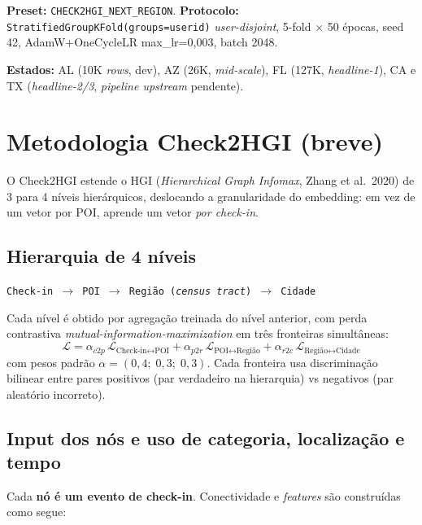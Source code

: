 \documentclass[11pt,a4paper]{article}
\begin{document}
\textbf{Preset:} \texttt{CHECK2HGI\_NEXT\_REGION}. \textbf{Protocolo:} \texttt{StratifiedGroupKFold(groups=userid)} \textit{user-disjoint}, 5-fold $\times$ 50 épocas, seed 42, AdamW+OneCycleLR max\_lr=0{,}003, batch 2048.

\textbf{Estados:} AL (10K \textit{rows}, dev), AZ (26K, \textit{mid-scale}), FL (127K, \textit{headline-1}), CA e TX (\textit{headline-2/3}, \textit{pipeline upstream} pendente).

\section{Metodologia Check2HGI (breve)}

O Check2HGI estende o HGI (\textit{Hierarchical Graph Infomax}, Zhang et al.\ 2020) de 3 para 4 níveis hierárquicos, deslocando a granularidade do embedding: em vez de um vetor por POI, aprende um vetor \emph{por check-in}.

\subsection*{Hierarquia de 4 níveis}

\begin{center}
\small
\texttt{Check-in\ $\to$\ POI\ $\to$\ Região (\textit{census tract})\ $\to$\ Cidade}
\end{center}

Cada nível é obtido por agregação treinada do nível anterior, com perda contrastiva \textit{mutual-information-maximization} em três fronteiras simultâneas:
$$
\mathcal{L} = \alpha_{c2p}\,\mathcal{L}_{\text{Check-in}\leftrightarrow\text{POI}} + \alpha_{p2r}\,\mathcal{L}_{\text{POI}\leftrightarrow\text{Região}} + \alpha_{r2c}\,\mathcal{L}_{\text{Região}\leftrightarrow\text{Cidade}}
$$
com pesos padrão $\alpha = (0{,}4;\;0{,}3;\;0{,}3)$. Cada fronteira usa discriminação bilinear entre pares positivos (par verdadeiro na hierarquia) vs negativos (par aleatório incorreto).

\subsection*{Input dos nós e uso de categoria, localização e tempo}

Cada \textbf{nó é um evento de check-in}. Conectividade e \textit{features} são construídas como segue:
\end{document}
